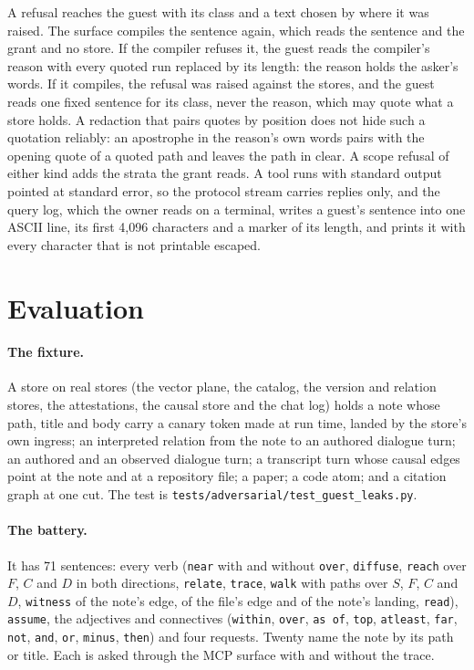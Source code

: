 \documentclass[11pt]{article}
\theoremstyle{plain}
\theoremstyle{definition}
\theoremstyle{remark}
\begin{document}
A refusal reaches the guest with its class and a text chosen by where it was raised. The surface
compiles the sentence again, which reads the sentence and the grant and no store. If the compiler
refuses it, the guest reads the compiler's reason with every quoted run replaced by its length:
the reason holds the asker's words. If it compiles, the refusal was raised against the stores, and
the guest reads one fixed sentence for its class, never the reason, which may quote what a store
holds. A redaction that pairs quotes by position does not hide such a quotation reliably: an
apostrophe in the reason's own words pairs with the opening quote of a quoted path and leaves the
path in clear. A scope refusal of either kind adds the strata the grant reads. A tool runs with
standard output pointed at standard error, so the protocol stream carries replies only, and the
query log, which the owner reads on a terminal, writes a guest's sentence into one ASCII line, its
first 4{,}096 characters and a marker of its length, and prints it with every character that is
not printable escaped.

\section{Evaluation}

\paragraph{The fixture.}
A store on real stores (the vector plane, the catalog, the version and relation stores, the
attestations, the causal store and the chat log) holds a note whose path, title and body carry a
canary token made at run time, landed by the store's own ingress; an interpreted relation from the
note to an authored dialogue turn; an authored and an observed dialogue turn; a transcript turn
whose causal edges point at the note and at a repository file; a paper; a code atom; and a
citation graph at one cut. The test is \texttt{tests/adversarial/test\_guest\_leaks.py}.

\paragraph{The battery.}
It has 71 sentences: every verb (\texttt{near} with and without \texttt{over}, \texttt{diffuse},
\texttt{reach} over $F$, $C$ and $D$ in both directions, \texttt{relate}, \texttt{trace},
\texttt{walk} with paths over $S$, $F$, $C$ and $D$, \texttt{witness} of the note's edge, of the
file's edge and of the note's landing, \texttt{read}), \texttt{assume}, the adjectives and
connectives (\texttt{within}, \texttt{over}, \texttt{as of}, \texttt{top}, \texttt{atleast},
\texttt{far}, \texttt{not}, \texttt{and}, \texttt{or}, \texttt{minus}, \texttt{then}) and four
requests. Twenty name the note by its path or title. Each is asked through the MCP surface with
and without the trace.
\end{document}
